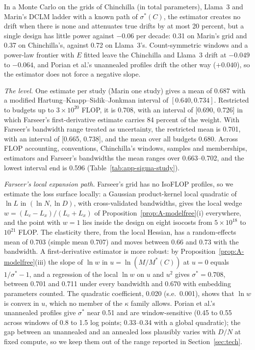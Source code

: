 In a Monte Carlo on the grids of Chinchilla (in total parameters), Llama~3 and Marin's DCLM ladder with a known path of
$\sigma^*(C)$, the estimator creates no drift when there is none and attenuates true drifts by at most 20 percent, but a
single design has little power against $-0.06$ per decade: 0.31 on Marin's grid and 0.37 on Chinchilla's, against 0.72
on Llama~3's. Count-symmetric windows and a power-law frontier with $E$ fitted leave the Chinchilla and Llama~3 drift at
$-0.049$ to $-0.064$, and Porian et al.'s unannealed profiles drift the other way ($+0.040$), so the estimator does not
force a negative slope.

\textit{The level.} One estimate per study (Marin one study) gives a mean of 0.687 with a modified
Hartung--Knapp--Sidik--Jonkman interval of $[0.640,0.734]$. Restricted to budgets up to $3\times10^{20}$ FLOP, it is
0.708, with an interval of [0.690, 0.726] in which Farseer's first-derivative estimate carries 84 percent of the weight.
With Farseer's bandwidth range treated as uncertainty, the restricted mean is 0.701, with an interval of [0.665, 0.738],
and the mean over all budgets 0.680. Across FLOP accounting, conventions, Chinchilla's windows, samples and memberships,
estimators and Farseer's bandwidths the mean ranges over 0.663--0.702, and the lowest interval end is 0.596
(Table~\ref{tab:app-sigma-study}).

\textit{Farseer's local expansion path.} Farseer's grid has no IsoFLOP profiles, so we estimate the loss surface locally: a
Gaussian product-kernel local quadratic of $\ln L$ in $(\ln N,\ln D)$, with cross-validated bandwidths, gives the local
wedge $w=(L_c-L_x)/(L_c+L_x)$ of Proposition~\ref{prop:A-modelfree}(i) everywhere, and the point with $w=1$ lies inside the
design on eight isocosts from $5\times10^{18}$ to $10^{21}$ FLOP. The elasticity there, from the local Hessian, has a
random-effects mean of 0.703 (simple mean 0.707) and moves between 0.66 and 0.73 with the bandwidth. A first-derivative estimator is more robust: by
Proposition~\ref{prop:A-modelfree}(iii) the slope of $\ln w$ in $u=\ln(M/M^*(C))$ at $u=0$ equals $1/\sigma^*-1$, and a
regression of the local $\ln w$ on $u$ and $u^2$ gives $\sigma^*=0.708$, between 0.701 and 0.711 under every bandwidth and
0.670 with embedding parameters counted. The quadratic coefficient, 0.020 (s.e.\ 0.001), shows that $\ln w$ is convex in $u$,
which no member of the $\kappa$ family allows. Porian et al.'s unannealed profiles give $\sigma^*$ near 0.51 and are
window-sensitive (0.45 to 0.55 across windows of 0.8 to 1.5 log points; 0.33--0.34 with a global quadratic); the gap between an unannealed and an annealed loss plausibly varies with $D/N$ at fixed
compute, so we keep them out of the range reported in Section~\ref{sec:tech}.

